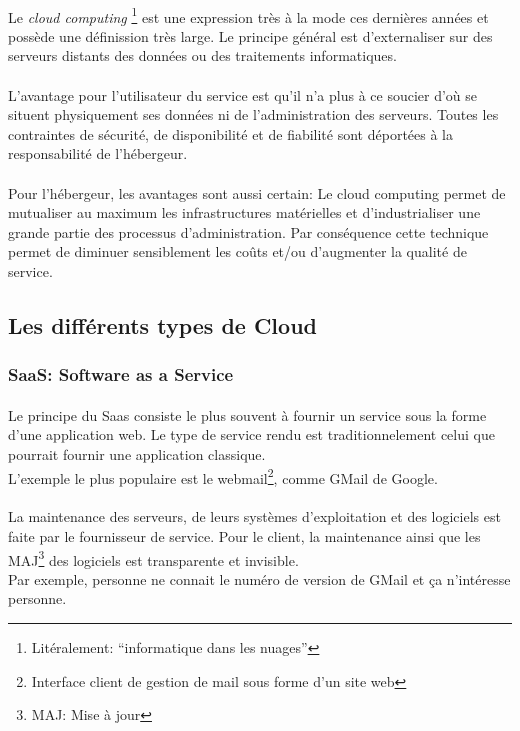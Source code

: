 \paragraph*{}
Le \emph{cloud computing} \footnote{Litéralement: ``informatique dans les nuages''} est une expression
très à la mode ces dernières années et possède une définission très large.
Le principe général est d'externaliser sur des serveurs distants des données ou
des traitements informatiques.

\paragraph*{}
L'avantage pour l'utilisateur du service est qu'il n'a plus à ce soucier d'où se situent physiquement
ses données ni de l'administration des serveurs. Toutes les contraintes de sécurité, de disponibilité
et de fiabilité sont déportées à la responsabilité de l'hébergeur.

\paragraph*{}
Pour l'hébergeur, les avantages sont aussi certain: Le cloud computing permet de mutualiser au maximum
les infrastructures matérielles et d'industrialiser une grande partie des processus d'administration.
Par conséquence cette technique permet de diminuer sensiblement les coûts et/ou d'augmenter la qualité
de service.

\subsection{Les différents types de Cloud}

\subsubsection{SaaS: Software as a Service}
\paragraph*{}
Le principe du Saas consiste le plus souvent à fournir un service sous la forme d'une application web.
Le type de service rendu est traditionnelement celui que pourrait fournir une application classique.
\\
L'exemple le plus populaire est le webmail\footnote{Interface client de gestion de mail sous forme d'un site web}, comme GMail de Google.

\paragraph*{}
La maintenance des serveurs, de leurs systèmes d'exploitation et des logiciels est faite par le fournisseur de service.
Pour le client, la maintenance ainsi que les MAJ\footnote{MAJ: Mise à jour} des logiciels est transparente et invisible.
\\
Par exemple, personne ne connait le numéro de version de GMail et ça n'intéresse personne.

